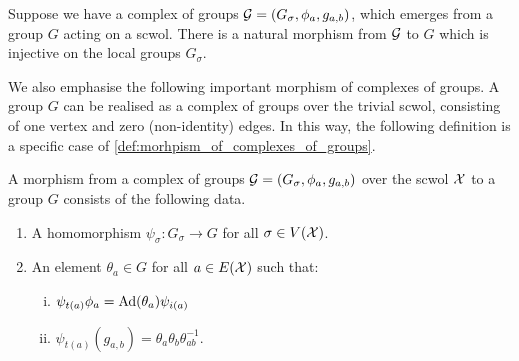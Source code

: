 \begin{remark}
\label{rem:morphism_from_developed_cx_of_groups}
    Suppose we have a complex of groups $\mathcal{G} = (G_\sigma, \phi_a, g_{a,b})$, which emerges from a group  $G$ acting on a scwol.
    There is a natural morphism from $\mathcal{G}$ to $G$ which is injective on the local groups  $G_\sigma$.
\end{remark}
We also emphasise the following important morphism of complexes of groups.
A group $G$ can be realised as a complex of groups over the trivial scwol, consisting of one vertex and zero (non-identity) edges.
In this way, the following definition is a specific case of \cref{def:morhpism_of_complexes_of_groups}.

\begin{definition}
	A morphism from a complex of groups $\mathcal{G} = (G_\sigma, \phi_a, g_{a,b})$ over the scwol $\mathcal{X}$ to a group $G$ consists of the following data.
	\begin{enumerate}
		\item A homomorphism $\psi_\sigma \colon G_\sigma \to G$ for all $\sigma \in V(\mathcal{X})$.
		\item An element $\theta_a \in G$ for all $a \in E(\mathcal{X})$ such that:
		      \begin{enumerate}[(i)]
			      \item $\psi_{t(a)}\phi_a = \operatorname{Ad}(\theta_a)\psi_{i(a)}$
			      \item $\psi_{t(a)}(g_{a,b}) = \theta_a\theta_b\theta_{ab}^{-1}$.
		      \end{enumerate}
	\end{enumerate}
	\label{def:morphism_of_complex_of_groups_to_group}
\end{definition}

